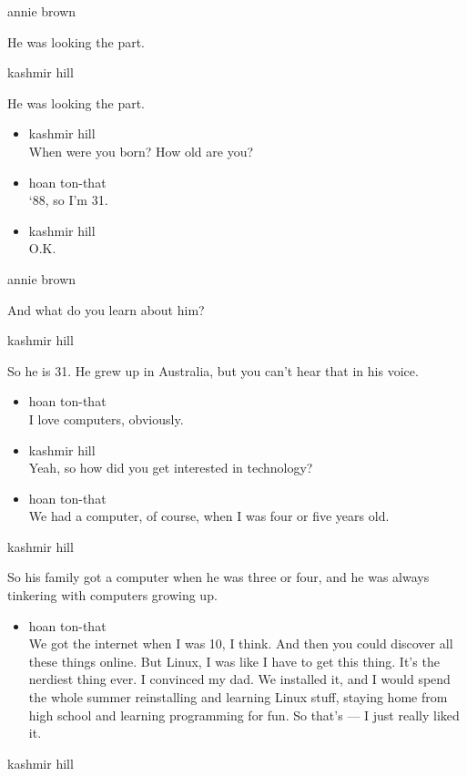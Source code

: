 annie brown

He was looking the part.

kashmir hill

He was looking the part.

\begin{itemize}
\item
  kashmir hill\\
  When were you born? How old are you?
\item
  hoan ton-that\\
  `88, so I'm 31.
\item
  kashmir hill\\
  O.K.
\end{itemize}

annie brown

And what do you learn about him?

kashmir hill

So he is 31. He grew up in Australia, but you can't hear that in his
voice.

\begin{itemize}
\item
  hoan ton-that\\
  I love computers, obviously.
\item
  kashmir hill\\
  Yeah, so how did you get interested in technology?
\item
  hoan ton-that\\
  We had a computer, of course, when I was four or five years old.
\end{itemize}

kashmir hill

So his family got a computer when he was three or four, and he was
always tinkering with computers growing up.

\begin{itemize}
\tightlist
\item
  hoan ton-that\\
  We got the internet when I was 10, I think. And then you could
  discover all these things online. But Linux, I was like I have to get
  this thing. It's the nerdiest thing ever. I convinced my dad. We
  installed it, and I would spend the whole summer reinstalling and
  learning Linux stuff, staying home from high school and learning
  programming for fun. So that's --- I just really liked it.
\end{itemize}

kashmir hill

